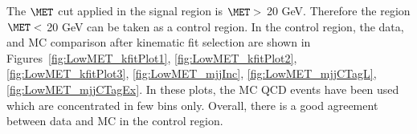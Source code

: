 The $\MET$ cut applied in the signal region is $\MET > $ 20 GeV.
Therefore the region $\MET < $ 20 GeV can be taken as a control
region. In the control region, the data, and MC comparison after kinematic fit selection are shown in
Figures~\ref{fig:LowMET_kfitPlot1}, \ref{fig:LowMET_kfitPlot2}, \ref{fig:LowMET_kfitPlot3}, \ref{fig:LowMET_mjjInc}, 
\ref{fig:LowMET_mjjCTagL}, \ref{fig:LowMET_mjjCTagEx}. In these plots, the MC QCD
events have been used which are concentrated in few bins only. 
Overall, there is a good agreement between data and MC in the control region.

\begin{figure}
    \centering  
    \vfil

\end{figure}
